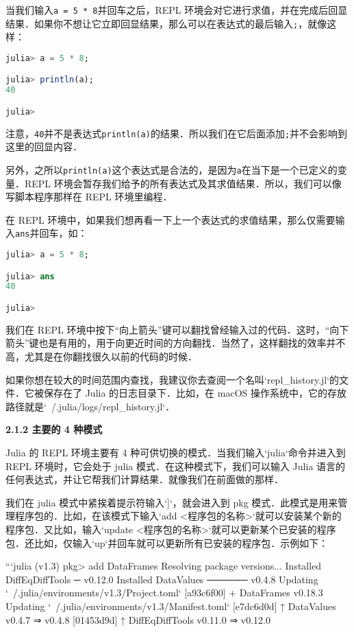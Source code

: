 当我们输入\verb|a = 5 * 8|并回车之后，REPL 环境会对它进行求值，并在完成后回显结果．如果你不想让它立即回显结果，那么可以在表达式的最后输入\verb|;|，就像这样：

\begin{lstlisting}[language=julia]
julia> a = 5 * 8;

julia> println(a);
40

julia> 
\end{lstlisting}

注意，\verb|40|并不是表达式\verb|println(a)|的结果．所以我们在它后面添加\verb|;|并不会影响到这里的回显内容．

另外，之所以\verb|println(a)|这个表达式是合法的，是因为\verb|a|在当下是一个已定义的变量．REPL 环境会暂存我们给予的所有表达式及其求值结果．所以，我们可以像写脚本程序那样在 REPL 环境里编程．

在 REPL 环境中，如果我们想再看一下上一个表达式的求值结果，那么仅需要输入\verb|ans|并回车，如：

\begin{lstlisting}[language=julia]
julia> a = 5 * 8;

julia> ans
40

julia> 
\end{lstlisting}

我们在 REPL 环境中按下“向上箭头”键可以翻找曾经输入过的代码．这时，“向下箭头”键也是有用的，用于向更近时间的方向翻找．当然了，这样翻找的效率并不高，尤其是在你翻找很久以前的代码的时候．

如果你想在较大的时间范围内查找，我建议你去查阅一个名叫`repl_history.jl`的文件．它被保存在了 Julia 的日志目录下．比如，在 macOS 操作系统中，它的存放路径就是`~/.julia/logs/repl_history.jl`．

\textbf{2.1.2 主要的 4 种模式}

Julia 的 REPL 环境主要有 4 种可供切换的模式．当我们输入`julia`命令并进入到 REPL 环境时，它会处于 julia 模式．在这种模式下，我们可以输入 Julia 语言的任何表达式，并让它帮我们计算结果．就像我们在前面做的那样．

我们在 julia 模式中紧挨着提示符输入`]`，就会进入到 pkg 模式．此模式是用来管理程序包的．比如，在该模式下输入`add <程序包的名称>`就可以安装某个新的程序包．又比如，输入`update <程序包的名称>`就可以更新某个已安装的程序包．还比如，仅输入`up`并回车就可以更新所有已安装的程序包．示例如下：

```julia
(v1.3) pkg> add DataFrames
 Resolving package versions...
 Installed DiffEqDiffTools ─ v0.12.0
 Installed DataValues ────── v0.4.8
  Updating `~/.julia/environments/v1.3/Project.toml`
  [a93c6f00] + DataFrames v0.18.3
  Updating `~/.julia/environments/v1.3/Manifest.toml`
  [e7dc6d0d] ↑ DataValues v0.4.7 ⇒ v0.4.8
  [01453d9d] ↑ DiffEqDiffTools v0.11.0 ⇒ v0.12.0

